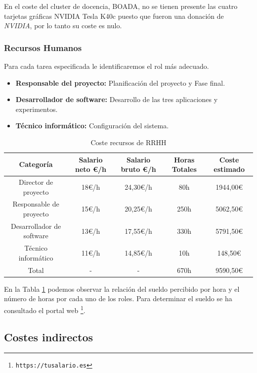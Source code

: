 \documentclass[titlepage,12pt]{report}
\begin{document}
En el coste del cluster de docencia, BOADA, no se tienen presente las cuatro tarjetas gráficas NVIDIA Tesla K40c puesto que fueron una donación de \textit{NVIDIA}, por lo tanto su coste es nulo.

\subsubsection{Recursos Humanos}


Para cada tarea especificada le identificaremos el rol más adecuado. 
\begin{itemize}
	\item \textbf{Responsable del proyecto:} Planificación del proyecto y Fase final.
	\item \textbf{Desarrollador de software:} Desarrollo de las tres aplicaciones y experimentos.
	\item \textbf{Técnico informático:} Configuración del sistema.
\end{itemize}

\begin{table}[H]
	\centering
	\begin{tabular}{|c|c|c|c|c|}
		\hline
		\textbf{Categoría} & \textbf{Salario neto €/h} & \textbf{Salario bruto €/h} & \textbf{Horas Totales} & \textbf{Coste estimado} \\ \hline \hline
		Director de proyecto 	  & 18€/h & 24,30€/h & 80h  & 1944,00€ \\ \hline
		Responsable de proyecto   & 15€/h & 20,25€/h & 250h & 5062,50€ \\ \hline
		Desarrollador de software & 13€/h & 17,55€/h & 330h & 5791,50€ \\ \hline
		Técnico informático 	  & 11€/h & 14,85€/h & 10h  &  148,50€ \\ \hline \hline			
		Total 					  & - 	  & - 		 & 670h  & 9590,50€ \\ \hline
	\end{tabular}
	\caption{Coste recursos de RRHH}
	\label{rrhh_1}
\end{table}

En la Tabla \ref{rrhh_1} podemos observar la relación del sueldo percibido por hora y el número de horas por cada uno de los roles. Para determinar el sueldo se ha consultado el portal web \footnote{\texttt{https://tusalario.es}}.

\subsection{Costes indirectos}
\end{document}
